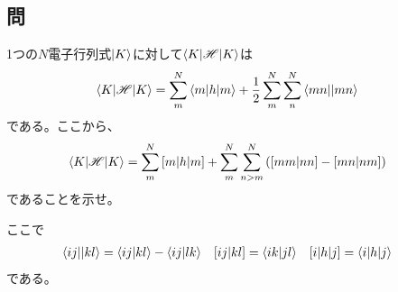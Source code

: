 \subsection{問}
1つの$N$電子行列式$\ket{K}$に対して$\braket{K|\mathscr{H}|K}$は
\begin{align}
	\braket{K|\mathscr{H}|K}
&=
	\sum_{m}^{N} \braket{m|h|m}
	+
	\frac{1}{2}
	\sum_{m}^{N} \sum_{n}^{N} {\braket{mn||mn}}
\end{align}
である。ここから、
\begin{align}
	\braket{K|\mathscr{H}|K}
&=
	\sum_{m}^{N} {[m|h|m]}
	+
	\sum_{m}^{N} \sum_{n>m}^{N}\left(
		{[mm|nn]}
		-
		{[mn|nm]}
	\right)
\end{align}
であることを示せ。

ここで
\begin{align}
	\antitwo{ij}{kl}
&=
	\phystwo{ij}{kl}
	-
	\phystwo{ij}{lk} &
%
%
	\chemtwo{ij}{kl}
&=
	\phystwo{ik}{jl} &
%
%
	\chemone{i}{h}{j}
&=
	\braket{i|h|j}
\end{align}
である。


